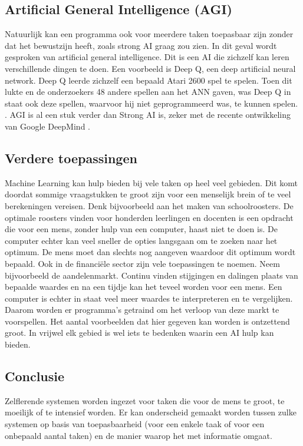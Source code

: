\subsection{Artificial General Intelligence (AGI)}
Natuurlijk kan een programma ook voor meerdere taken toepasbaar zijn zonder dat het bewustzijn heeft, zoals strong AI graag zou zien. In dit geval wordt gesproken van artificial general intelligence. Dit is een AI die zichzelf kan leren verschillende dingen te doen. Een voorbeeld is Deep Q, een deep artificial neural network. Deep Q leerde zichzelf een bepaald Atari 2600 spel te spelen. Toen dit lukte en de onderzoekers 48 andere spellen aan het ANN gaven, was Deep Q in staat ook deze spellen, waarvoor hij niet geprogrammeerd was, te kunnen spelen. \cite{DeepQ}.
AGI is al een stuk verder dan Strong AI is, zeker met de recente ontwikkeling van Google DeepMind \cite{DeepMind1}.

\subsection{Verdere toepassingen}
Machine Learning kan hulp bieden bij vele taken op heel veel gebieden. Dit komt doordat sommige vraagstukken te groot zijn voor een menselijk brein of te veel berekeningen vereisen. Denk bijvoorbeeld aan het maken van schoolroosters. De optimale roosters vinden voor honderden leerlingen en docenten is een opdracht die voor een mens, zonder hulp van een computer, haast niet te doen is. De computer echter kan veel sneller de opties langsgaan om te zoeken naar het optimum. De mens moet dan slechts nog aangeven waardoor dit optimum wordt bepaald.
Ook in de financi\"{e}le sector zijn vele toepassingen te noemen. Neem bijvoorbeeld de aandelenmarkt. Continu vinden stijgingen en dalingen plaats van bepaalde waardes en na een tijdje kan het teveel worden voor een mens. Een computer is echter in staat veel meer waardes te interpreteren en te vergelijken. Daarom worden er programma's getraind om het verloop van deze markt te voorspellen.
Het aantal voorbeelden dat hier gegeven kan worden is ontzettend groot. In vrijwel elk gebied is wel iets te bedenken waarin een AI hulp kan bieden.

\subsection{Conclusie}
Zelflerende systemen worden ingezet voor taken die voor de mens te groot, te moeilijk of te intensief worden. Er kan onderscheid gemaakt worden tussen zulke systemen op basis van toepasbaarheid (voor een enkele taak of voor een onbepaald aantal taken) en de manier waarop het met informatie omgaat.